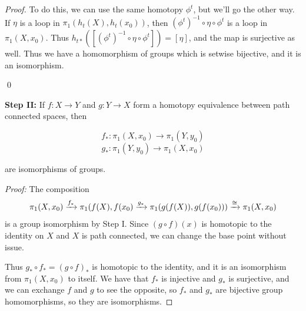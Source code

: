 \begin{proof}
To do this, we can use the same homotopy $\phi^t$, but we'll go the other way.  If $\eta$ is a loop in $\pi_1(h_t(X),h_t(x_0))$, then $(\phi^{t})^{-1}\circ \eta\circ \phi^t$ is a loop in $\pi_1(X,x_0)$.  Thus $h_{t*}([(\phi^{t})^{-1}\circ \eta\circ \phi^t]) = [\eta]$, and the map is surjective as well.  Thus we have a homomorphism of groups which is setwise bijective, and it is an isomorphism.

\qed

\textbf{Step II:} If $f:X\rightarrow Y$ and $g:Y\rightarrow X$ form a homotopy equivalence between path connected spaces, then

$$f_*:\pi_1(X,x_0)\rightarrow \pi_1(Y,y_0)$$
$$g_*:\pi_1(Y,y_0)\rightarrow \pi_1(X,x_0)$$

are isomorphisms of groups.

\textit{Proof:} The composition
$$\pi_1(X,x_0)\xrightarrow{f_*}\pi_1(f(X),f(x_0)\xrightarrow{g_*}\pi_1(g(f(X)),g(f(x_0))) \xrightarrow{\cong}\pi_1(X,x_0)$$
is a group isomorphism by Step I.  Since $(g\circ f)(x)$ is homotopic to the identity on $X$ and $X$ is path connected, we can change the base point without issue.

Thus $g_*\circ f_* = (g\circ f)_*$ is homotopic to the identity, and it is an isomorphism from $\pi_1(X,x_0)$ to itself. We have that $f_*$ is injective and $g_*$ is surjective, and we can exchange $f$ and $g$ to see the opposite, so $f_*$ and $g_*$ are bijective group homomorphisms, so they are isomorphisms.
\end{proof}
